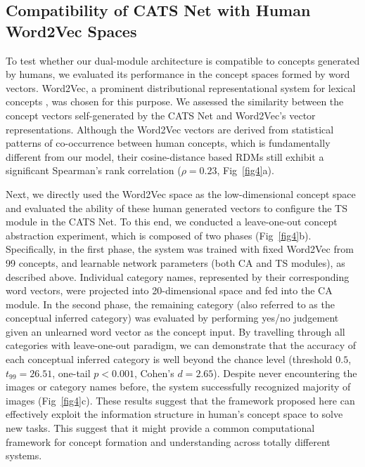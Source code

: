 \documentclass[pdflatex,sn-mathphys-num,lineno]{sn-jnl}%
\begin{document}
\begin{CJK}{UTF8}{gbsn}
\subsection{Compatibility of CATS Net with Human Word2Vec Spaces} 

To test whether our dual-module architecture is compatible to concepts generated by humans, we evaluated its performance in the concept spaces formed by word vectors. Word2Vec, a prominent distributional representational system for lexical concepts \cite{mikolov_distributed_2013,mikolov_advances_2018}, was chosen for this purpose. We assessed the similarity between the concept vectors self-generated by the CATS Net and Word2Vec’s vector representations. Although the Word2Vec vectors are derived from statistical patterns of co-occurrence between human concepts, which is fundamentally different from our model, their cosine-distance based RDMs still exhibit a significant Spearman’s rank correlation ($\rho=0.23$, Fig~\ref{fig4}a). 

Next, we directly used the Word2Vec space as the low-dimensional concept space and evaluated the ability of these human generated vectors to configure the TS module in the CATS Net. To this end, we conducted a leave-one-out concept abstraction experiment, which is composed of two phases (Fig~\ref{fig4}b). Specifically, in the first phase, the system was trained with fixed Word2Vec from 99 concepts, and learnable network parameters (both CA and TS modules), as described above. Individual category names, represented by their corresponding word vectors, were projected into 20-dimensional space and fed into the CA module. In the second phase, the remaining category (also referred to as the conceptual inferred category) was evaluated by performing yes/no judgement given an unlearned word vector as the concept input. By travelling through all categories with leave-one-out paradigm, we can demonstrate that the accuracy of each conceptual inferred category is well beyond the chance level (threshold $0.5$, $t_{99}=26.51$, one-tail $p < 0.001$, Cohen's $d = 2.65$). Despite never encountering the images or category names before, the system successfully recognized majority of images (Fig~\ref{fig4}c). These results suggest that the framework proposed here can effectively exploit the information structure in human's concept space to solve new tasks. This suggest that it might provide a common computational framework for concept formation and understanding across totally different systems.


\end{CJK}
\end{document}
